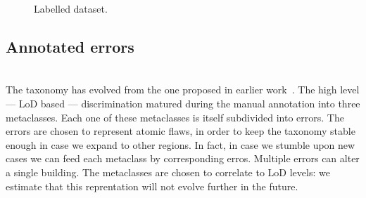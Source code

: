 \documentclass[a4paper, 11pt]{article}
\begin{document}
	\begin{figure}[H]
		{
			\caption{\label{fig::dataset} Labelled dataset.}
		}
	\end{figure}

	\subsection{Annotated errors}
~\\

	The taxonomy has evolved from the one proposed in earlier work~\cite{michelin2013quality}. The high level --- LoD based --- discrimination matured during the manual annotation into three metaclasses. Each one of these metaclasses is itself subdivided into errors. The errors are chosen to represent atomic flaws, in order to keep the taxonomy stable enough in case we expand to other regions. In fact, in case we stumble upon new cases we can feed each metaclass by corresponding erros. Multiple errors can alter a single building. The metaclasses are chosen to correlate to LoD levels: we estimate that this reprentation will not evolve further in the future.
\end{document}
